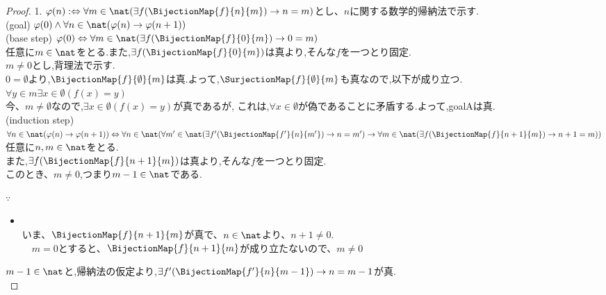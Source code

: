 \begin{proof} 1. $\varphi (n) :\Leftrightarrow \forall m \in \nat (\exists f(\BijectionMap{f}{n}{m}) \rightarrow n = m)$とし、$n$に関する数学的帰納法で示す.\\

(goal) $\varphi (0) \land \forall n \in \nat ( \varphi (n) \rightarrow \varphi (n+1))$\\

(base step) $\varphi (0) \Leftrightarrow  \forall m \in \nat  (\exists f(\BijectionMap{f}{0}{m}) \rightarrow 0 = m)$ \\
任意に$m \in \nat$をとる.また,$\exists f(\BijectionMap{f}{0}{m})$は真より,そんな$f$を一つとり固定.\\
$m \neq 0$とし,背理法で示す.\\
$ 0 = \emptyset$より,$\BijectionMap{f}{\emptyset}{m}$は真.よって,$\SurjectionMap{f}{\emptyset}{m}$も真なので,以下が成り立つ.\\
$\forall y \in m \exists x \in \emptyset (f(x) = y)$\\
今、$m \neq \emptyset$なので,$\exists x \in \emptyset (f(x) = y)$が真であるが,
これは,$\forall x \in \emptyset$が偽であることに矛盾する.よって,goalAは真.\\

(induction step) $\forall n \in \nat ( \varphi (n) \rightarrow \varphi (n+1)) \\
\Leftrightarrow \forall n \in \nat(\forall m' \in \nat  (\exists f'(\BijectionMap{f'}{n}{m'}) \rightarrow  n = m') \rightarrow 
\forall m \in \nat  (\exists f(\BijectionMap{f}{n+1}{m}) \rightarrow  n+1 = m))$ \\
任意に$n,m \in \nat$をとる.\\
また,$\exists f(\BijectionMap{f}{n+1}{m})$は真より,そんな$f$を一つとり固定.\\
このとき、$m \neq 0$,つまり$m-1 \in \nat$である.\\

\begin{sub-block}{{\boldmath $\because$}\,}
\begin{itemize}
\item[] \hspace{-0.5cm} \\
	いま、$\BijectionMap{f}{n+1}{m}$が真で、$n \in \nat$より、$n+1 \neq 0$.\\
　$m = 0$とすると、$\BijectionMap{f}{n+1}{m}$が成り立たないので、$m \neq 0$
\end{itemize}
\end{sub-block}
$m-1 \in \nat$と,帰納法の仮定より,$ \exists f'(\BijectionMap{f'}{n}{m-1})\rightarrow  n = m-1$が真.\\


\end{proof}
